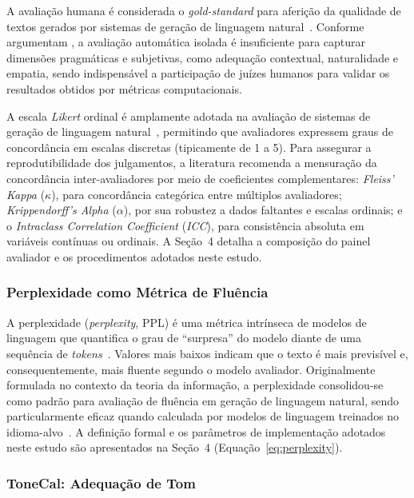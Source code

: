 \documentclass[12pt, a4paper]{article}
\numberwithin{equation}{section}
\begin{document}
A avaliação humana é considerada o \textit{gold-standard} para aferição da qualidade de textos gerados por sistemas de geração de linguagem natural~\cite{celikyilmaz2021Evaluation}. Conforme argumentam , a avaliação automática isolada é insuficiente para capturar dimensões pragmáticas e subjetivas, como adequação contextual, naturalidade e empatia, sendo indispensável a participação de juízes humanos para validar os resultados obtidos por métricas computacionais.

A escala \textit{Likert} ordinal é amplamente adotada na avaliação de sistemas de geração de linguagem natural~\cite{howcroft2021}, permitindo que avaliadores expressem graus de concordância em escalas discretas (tipicamente de 1 a 5). Para assegurar a reprodutibilidade dos julgamentos, a literatura recomenda a mensuração da concordância inter-avaliadores por meio de coeficientes complementares: \textit{Fleiss' Kappa} ($\kappa$), para concordância categórica entre múltiplos avaliadores; \textit{Krippendorff's Alpha} ($\alpha$), por sua robustez a dados faltantes e escalas ordinais; e o \textit{Intraclass Correlation Coefficient} (\textit{ICC}), para consistência absoluta em variáveis contínuas ou ordinais. A Seção~4 detalha a composição do painel avaliador e os procedimentos adotados neste estudo.

\subsubsection{Perplexidade como Métrica de Fluência}

A perplexidade (\textit{perplexity}, PPL) é uma métrica intrínseca de modelos de linguagem que quantifica o grau de ``surpresa'' do modelo diante de uma sequência de \textit{tokens}~\cite{serrano2023}. Valores mais baixos indicam que o texto é mais previsível e, consequentemente, mais fluente segundo o modelo avaliador. Originalmente formulada no contexto da teoria da informação, a perplexidade consolidou-se como padrão para avaliação de fluência em geração de linguagem natural, sendo particularmente eficaz quando calculada por modelos de linguagem treinados no idioma-alvo~\cite{pistotti2025}. A definição formal e os parâmetros de implementação adotados neste estudo são apresentados na Seção~4 (Equação~\ref{eq:perplexity}).

\subsubsection{ToneCal: Adequação de Tom}
\end{document}
